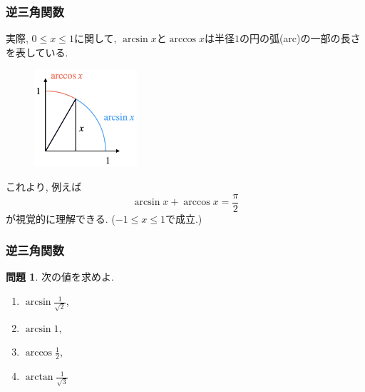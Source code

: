 \documentclass[dvipdfmx,cjk,10.2pt]{beamer}
\theoremstyle{definition}
\newtheorem{Prob}[Thm]{問題}
\begin{document}
\begin{frame}
\frametitle{逆三角関数}

実際, $0 \le x \le 1$に関して, $\arcsin x$と$\arccos x$は半径$1$の円の弧(arc)の一部の長さを表している. 

 \begin{figure}[htbp]
 \begin{center} 
  \includegraphics[width=38mm]{arc2.png}
 \end{center}
\end{figure}
\vspace{-3mm}

これより, 例えば
$$
\arcsin x + \arccos x = \frac{\pi}{2}
$$
が視覚的に理解できる. ($-1\le x \le 1$で成立.)

\end{frame}




\begin{frame}
\frametitle{逆三角関数}



\begin{Prob}
次の値を求めよ. 
\begin{enumerate}
\item $\arcsin \frac{1}{\sqrt{2}}$,  %
\item $\arcsin 1$, %
\item $\arccos \frac{1}{2}$, %
\item $\arctan \frac{1}{\sqrt{3}}$ %
\end{enumerate}
\end{Prob}

\end{frame}



\end{document}
